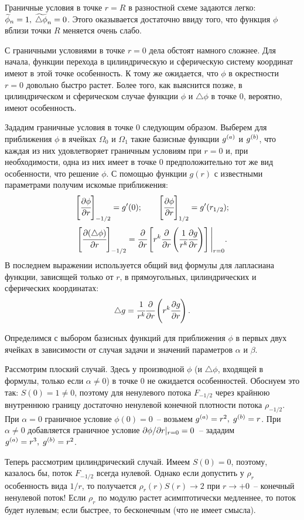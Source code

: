 Граничные условия в точке $r = R$ в разностной схеме задаются легко: ${\widetilde{\phi}}_n = 1, \; {\widetilde{\triangle \phi}}_n = 0$. Этого оказывается достаточно ввиду того, что функция $\phi$ вблизи точки $R$ меняется очень слабо.

С граничными условиями в точке $r = 0$ дела обстоят намного сложнее. Для начала, функции перехода в цилиндрическую и сферическую систему координат имеют в этой точке особенность. К тому же ожидается, что $\phi$ в окрестности $r = 0$ довольно быстро растет. Более того, как выяснится позже, в цилиндрическом и сферическом случае функции $\phi$ и $\triangle \phi$ в точке $0$, вероятно, имеют особенность.

Зададим граничные условия в точке $0$ следующим образом. Выберем для приближения $\phi$ в ячейках $\Omega_0$ и $\Omega_1$ такие базисные функции ${g^{(a)}}$ и ${g^{(b)}}$, что каждая из них удовлетворяет граничным условиям при $r = 0$ и, при необходимости, одна из них имеет в точке $0$ предположительно тот же вид особенности, что решение $\phi$. С помощью функции $g(r)$ с известными параметрами получим искомые приближения:
$${\left[ \cfrac{\partial \phi}{\partial r} \right]}_{-1/2} = g'(0); \qquad {\left[ \cfrac{\partial \phi}{\partial r} \right]}_{1/2} = g'(r_{1/2}) {\text{;}}$$
$${\left[ \cfrac{\partial (\triangle \phi)}{\partial r} \right]}_{-1/2} = \cfrac{\partial }{\partial r} \left[ r^k \cfrac{\partial }{\partial r} \left(\cfrac{1}{r^k} \cfrac{\partial g}{\partial r} \right) \right] \Bigg|_{r = 0} {\text{.}}$$
В последнем выражении используется общий вид формулы для лапласиана функции, зависящей только от $r$, в прямоугольных, цилиндрических и сферических координатах:
\begin{equation}
	\triangle g = \cfrac{1}{r^k} \cfrac{\partial }{\partial r} \left( r^k \cfrac{\partial g}{\partial r} \right) {\text{.}}
	\label{eq:laplasian_common}
\end{equation}

Определимся с выбором базисных функций для приближения $\phi$ в первых двух ячейках в зависимости от случая задачи и значений параметров $\alpha$ и $\beta$.

Рассмотрим плоский случай. Здесь у производной $\phi$ (и $\triangle \phi$, входящей в формулы, только если $\alpha \neq 0$) в точке $0$ не ожидается особенностей. Обоснуем это так: $S(0) = 1 \neq 0$, поэтому для ненулевого потока $F_{-1/2}$ через крайнюю внутреннюю границу достаточно ненулевой конечной плотности потока $\rho_{-1/2}$. При $\alpha = 0$ граничное условие $\phi(0) = 0$~-- возьмем ${g^{(a)}} = r^2, \; {g^{(b)}} = r$. При~$\alpha \neq 0$ добавляется граничное условие $\partial \phi / \partial r |_{r = 0} = 0$~-- зададим ${g^{(a)}} = r^3, \; {g^{(b)}} = r^2$.

Теперь рассмотрим цилиндрический случай. Имеем $S(0) = 0$, поэтому, казалось бы, поток $F_{-1/2}$ всегда нулевой. Однако если допустить у $\rho_r$ особенность вида $1/r$, то получается $\rho_r(r) S(r) \to 2$ при $r \to +0$~-- конечный ненулевой поток! Если $\rho_r$ по модулю растет асимптотически медленнее, то поток будет нулевым; если быстрее, то бесконечным (что не имеет смысла).


